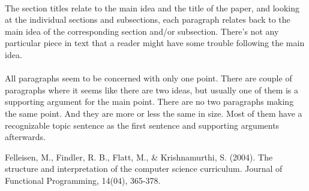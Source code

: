 \documentclass{article}
\begin{document}
\paragraph{} The section titles relate to the main idea and the title of the paper,
and looking at the individual sections and subsections, each paragraph
relates back to the main idea of the corresponding section and/or
subsection. There's not any particular piece in text that a reader
might have some trouble following the main idea.

\paragraph{} All paragraphs seem to be concerned with only one point. There are
couple of paragraphs where it seems like there are two ideas, but
usually one of them is a supporting argument for the main point. There
are no two paragraphs making the same point. And they are more or less
the same in size. Most of them have a recognizable topic sentence as
the first sentence and supporting arguments afterwards.



\begin{thebibliography}

 Felleisen, M., Findler, R. B., Flatt, M., &
  Krishnamurthi, S. (2004). The structure and interpretation of the
  computer science curriculum. Journal of Functional Programming,
  14(04), 365-378.



\end{thebibliography}
\end{document}
